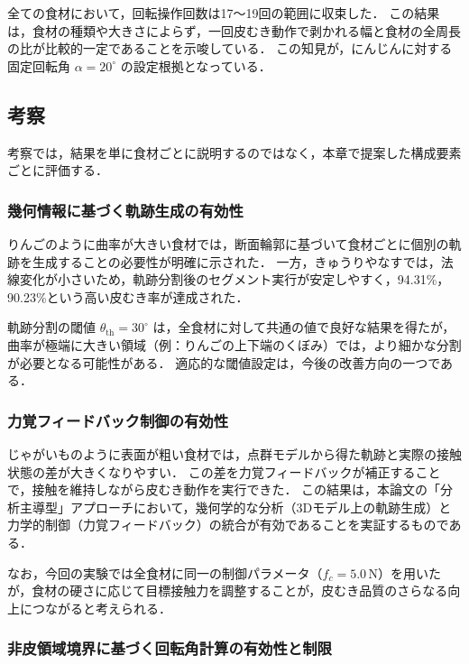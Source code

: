 全ての食材において，回転操作回数は17〜19回の範囲に収束した．
この結果は，食材の種類や大きさによらず，一回皮むき動作で剥かれる幅と食材の全周長の比が比較的一定であることを示唆している．
この知見が，にんじんに対する固定回転角 $\alpha = 20^\circ$ の設定根拠となっている．

\subsection{考察}

考察では，結果を単に食材ごとに説明するのではなく，本章で提案した構成要素ごとに評価する．

\subsubsection{幾何情報に基づく軌跡生成の有効性}

りんごのように曲率が大きい食材では，断面輪郭に基づいて食材ごとに個別の軌跡を生成することの必要性が明確に示された．
一方，きゅうりやなすでは，法線変化が小さいため，軌跡分割後のセグメント実行が安定しやすく，94.31\%，90.23\%という高い皮むき率が達成された．

軌跡分割の閾値 $\theta_{\mathrm{th}} = 30^\circ$ は，全食材に対して共通の値で良好な結果を得たが，曲率が極端に大きい領域（例：りんごの上下端のくぼみ）では，より細かな分割が必要となる可能性がある．
適応的な閾値設定は，今後の改善方向の一つである．

\subsubsection{力覚フィードバック制御の有効性}

じゃがいものように表面が粗い食材では，点群モデルから得た軌跡と実際の接触状態の差が大きくなりやすい．
この差を力覚フィードバックが補正することで，接触を維持しながら皮むき動作を実行できた．
この結果は，本論文の「分析主導型」アプローチにおいて，幾何学的な分析（3Dモデル上の軌跡生成）と力学的制御（力覚フィードバック）の統合が有効であることを実証するものである．

なお，今回の実験では全食材に同一の制御パラメータ（$f_c = 5.0$\,N）を用いたが，食材の硬さに応じて目標接触力を調整することが，皮むき品質のさらなる向上につながると考えられる．

\subsubsection{非皮領域境界に基づく回転角計算の有効性と制限}

